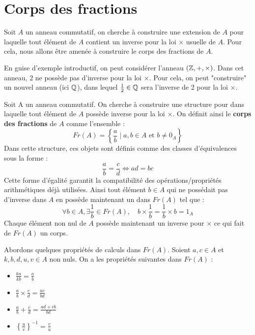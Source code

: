 
\section{Corps des fractions}

Soit $A$ un anneau commutatif, on cherche à construire une extension de $A$ pour laquelle tout élément de $A$ 
contient un inverse pour la loi $\times$ usuelle de $A$. 
Pour cela, nous allons être amenée à construire le corps des fractions de $A$. 

\vspace{0.3cm}

En guise d'exemple introductif, on peut considérer l'anneau $(\mathbb{Z},+,\times)$. 
Dans cet anneau, $2$ ne possède pas d'inverse pour la loi $\times$. 
Pour cela, on peut "construire" un nouvel anneau (ici $\mathbb{Q}$), dans lequel $ \frac{1}{2} \in \mathbb{Q}$ sera l'inverse de 2 
pour la loi $\times$. 

\begin{proposition}
    Soit A un anneau commutatif. On cherche à construire une structure pour dans laquelle tout élément de $A$ possède 
    inverse pour la loi $\times$. 
    On définit ainsi le \textbf{corps des fractions} de $A$ comme l'ensemble : 
        \[ \boxed{ Fr(A) = \left\{ \frac{a}{b} \; | \; a,b \in A \text{ et } b \not = 0_A \right\} } \]
    Dans cette structure, ces objets sont définis comme des classes d'équivalences sous la forme : 
        \[ \frac{a}{b} = \frac{c}{d} \iff ad = bc \] 
    Cette forme d'égalité garantit la compatibilité des opérations/propriétés arithmétiques déjà utilisées. 
    Ainsi tout élément $b \in A$ qui ne possédait pas d'inverse dans $A$ en possède maintenant un dans $Fr(A)$ tel que :
        \[ \forall b \in A, \exists \frac{1}{b} \in Fr(A), \quad b \times \frac{1}{b} = \frac{1}{b} \times b = 1_A \] 
    Chaque élément non nul de $A$ possède maintenant un inverse pour $\times$ ce qui fait de $Fr(A)$ un corps. 
\end{proposition}

\begin{prop}[Calculs]
    Abordons quelques propriétés de calculs dans $Fr(A)$. Soient $a,c \in A$ et $k,b,d,u,v \in A$ non nuls. 
    On a les propriétés suivantes dans $Fr(A)$ : 
    \begin{itemize}
        \item $ \frac{ka}{kb} = \frac{a}{b} $ 
        \item $ \frac{a}{b} \times \frac{c}{d} = \frac{ac}{bd} $ 
        \item $ \frac{a}{b} + \frac{c}{d} = \frac{ad + cb}{bd} $ 
        \item $ \left\{ \frac{u}{v} \right\} ^{-1} = \frac{v}{u} $
    \end{itemize}
\end{prop}

